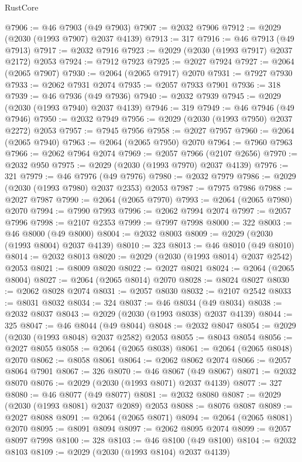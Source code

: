 \begin{lexlean}{RustCore}
\begin{coremodule}
@7906 := @46 @7903 (@49 @7903)
@7907 := @2032 @7906
@7912 := @2029 (@2030 (@1993 @7907) @2037 @4139)
@7913 := 317
@7916 := @46 @7913 (@49 @7913)
@7917 := @2032 @7916
@7923 := @2029 (@2030 (@1993 @7917) @2037 @2172) @2053
@7924 := @7912 @7923
@7925 := @2027 @7924
@7927 := @2064 (@2065 @7907)
@7930 := @2064 (@2065 @7917) @2070
@7931 := @7927 @7930
@7933 := @2062 @7931 @2074
@7935 := @2057 @7933 @7901
@7936 := 318
@7939 := @46 @7936 (@49 @7936)
@7940 := @2032 @7939
@7945 := @2029 (@2030 (@1993 @7940) @2037 @4139)
@7946 := 319
@7949 := @46 @7946 (@49 @7946)
@7950 := @2032 @7949
@7956 := @2029 (@2030 (@1993 @7950) @2037 @2272) @2053
@7957 := @7945 @7956
@7958 := @2027 @7957
@7960 := @2064 (@2065 @7940)
@7963 := @2064 (@2065 @7950) @2070
@7964 := @7960 @7963
@7966 := @2062 @7964 @2074
@7969 := @2057 @7966 (@2107 @2656)
@7970 := @2032 @950
@7975 := @2029 (@2030 (@1993 @7970) @2037 @4139)
@7976 := 321
@7979 := @46 @7976 (@49 @7976)
@7980 := @2032 @7979
@7986 := @2029 (@2030 (@1993 @7980) @2037 @2353) @2053
@7987 := @7975 @7986
@7988 := @2027 @7987
@7990 := @2064 (@2065 @7970)
@7993 := @2064 (@2065 @7980) @2070
@7994 := @7990 @7993
@7996 := @2062 @7994 @2074
@7997 := @2057 @7996
@7998 := @2107 @2353
@7999 := @7997 @7998
@8000 := 322
@8003 := @46 @8000 (@49 @8000)
@8004 := @2032 @8003
@8009 := @2029 (@2030 (@1993 @8004) @2037 @4139)
@8010 := 323
@8013 := @46 @8010 (@49 @8010)
@8014 := @2032 @8013
@8020 := @2029 (@2030 (@1993 @8014) @2037 @2542) @2053
@8021 := @8009 @8020
@8022 := @2027 @8021
@8024 := @2064 (@2065 @8004)
@8027 := @2064 (@2065 @8014) @2070
@8028 := @8024 @8027
@8030 := @2062 @8028 @2074
@8031 := @2057 @8030
@8032 := @2107 @2542
@8033 := @8031 @8032
@8034 := 324
@8037 := @46 @8034 (@49 @8034)
@8038 := @2032 @8037
@8043 := @2029 (@2030 (@1993 @8038) @2037 @4139)
@8044 := 325
@8047 := @46 @8044 (@49 @8044)
@8048 := @2032 @8047
@8054 := @2029 (@2030 (@1993 @8048) @2037 @2582) @2053
@8055 := @8043 @8054
@8056 := @2027 @8055
@8058 := @2064 (@2065 @8038)
@8061 := @2064 (@2065 @8048) @2070
@8062 := @8058 @8061
@8064 := @2062 @8062 @2074
@8066 := @2057 @8064 @7901
@8067 := 326
@8070 := @46 @8067 (@49 @8067)
@8071 := @2032 @8070
@8076 := @2029 (@2030 (@1993 @8071) @2037 @4139)
@8077 := 327
@8080 := @46 @8077 (@49 @8077)
@8081 := @2032 @8080
@8087 := @2029 (@2030 (@1993 @8081) @2037 @2089) @2053
@8088 := @8076 @8087
@8089 := @2027 @8088
@8091 := @2064 (@2065 @8071)
@8094 := @2064 (@2065 @8081) @2070
@8095 := @8091 @8094
@8097 := @2062 @8095 @2074
@8099 := @2057 @8097 @7998
@8100 := 328
@8103 := @46 @8100 (@49 @8100)
@8104 := @2032 @8103
@8109 := @2029 (@2030 (@1993 @8104) @2037 @4139)

\end{coremodule}
\end{lexlean}
